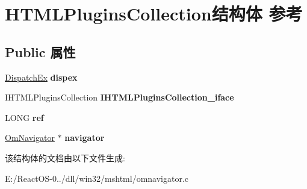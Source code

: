 \hypertarget{struct_h_t_m_l_plugins_collection}{}\section{H\+T\+M\+L\+Plugins\+Collection结构体 参考}
\label{struct_h_t_m_l_plugins_collection}
\subsection*{Public 属性}
\begin{DoxyCompactItemize}
\item 
\mbox{\label{struct_h_t_m_l_plugins_collection_a3d43e0e323c7bb104542248c5f581ad2}} 
\hyperlink{struct_dispatch_ex}{Dispatch\+Ex} {\bfseries dispex}
\item 
\mbox{\label{struct_h_t_m_l_plugins_collection_a4a8fda74992a6cc52729bfd5fd98510c}} 
I\+H\+T\+M\+L\+Plugins\+Collection {\bfseries I\+H\+T\+M\+L\+Plugins\+Collection\+\_\+iface}
\item 
\mbox{\label{struct_h_t_m_l_plugins_collection_a4a45fe5ef96d157f73e83119530e5424}} 
L\+O\+NG {\bfseries ref}
\item 
\mbox{\label{struct_h_t_m_l_plugins_collection_a7d510a4cf749ffda3ed193ee9c5f8e2e}} 
\hyperlink{struct_om_navigator}{Om\+Navigator} $\ast$ {\bfseries navigator}
\end{DoxyCompactItemize}


该结构体的文档由以下文件生成\+:\begin{DoxyCompactItemize}
\item 
E\+:/\+React\+O\+S-\/0../dll/win32/mshtml/omnavigator.\+c\end{DoxyCompactItemize}
